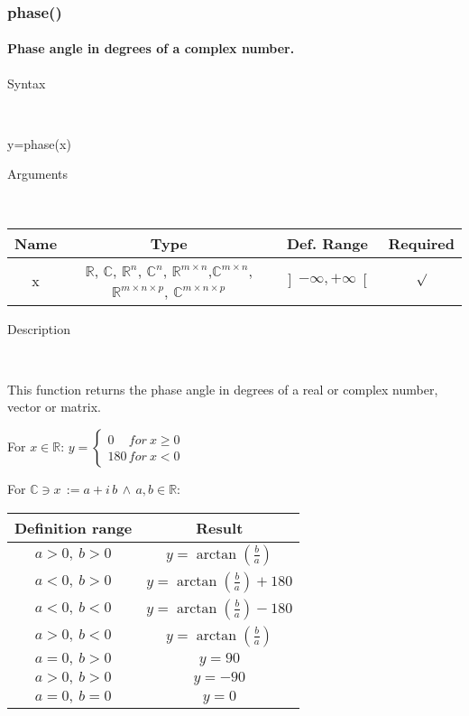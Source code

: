 \newpage
\subsubsection*{\hypertarget{phase}{}{\Large phase()}}


\paragraph{\label{par:Phase}Phase angle in degrees of a complex number.}

\begin{description}
\item [Syntax]~
\end{description}
y=phase(x)

\begin{description}
\item [Arguments]~
\end{description}
\begin{tabular}{|c|c|c|c|}
\hline 
Name&
Type&
Def. Range&
Required\tabularnewline
\hline
\hline 
x&
$\mathbb{R}$, $\mathbb{C}$, $\mathbb{R}^{n}$, $\mathbb{C}^{n}$,
$\mathbb{\mathbb{R}}^{m\times n}$,$\mathbb{\mathbb{C}}^{m\times n}$,
$\mathbb{\mathbb{R}}^{m\times n\times p}$, $\mathbb{\mathbb{C}}^{m\times n\times p}$&
$\left]-\infty,+\infty\right[$&
$\surd$\tabularnewline
\hline
\end{tabular}

\begin{description}
\item [Description]~
\end{description}
This function returns the phase angle in degrees of a real or complex
number, vector or matrix.

\medskip{}
For $x\in\mathbb{R}$: $y=\left\{ \begin{array}{l}
0\quad\, for\: x\geq0\\
180\, for\: x<0\end{array}\right.$
\medskip{}

For $\mathbb{\mathbb{C}}\ni x\,:=a+i\, b\,\wedge\, a,b\in\mathbb{R}$:

\medskip{}
\begin{tabular}{|c|c|}
\hline 
Definition range&
Result\tabularnewline
\hline
\hline 
$a>0,\: b>0$&
$y=\arctan\left({\textstyle \frac{b}{a}}\right)$\tabularnewline
\hline 
$a<0,\: b>0$&
$y=\arctan\left(\frac{b}{a}\right)+180$\tabularnewline
\hline 
$a<0,\: b<0$&
$y=\arctan\left(\frac{b}{a}\right)-180$\tabularnewline
\hline 
$a>0,\: b<0$&
$y=\arctan\left(\frac{b}{a}\right)$\tabularnewline
\hline 
$a=0,\: b>0$&
$y=90$\tabularnewline
\hline 
$a>0,\: b>0$&
$y=-90$\tabularnewline
\hline 
$a=0,\: b=0$&
$y=0$\tabularnewline
\hline
\end{tabular}
\medskip{}


